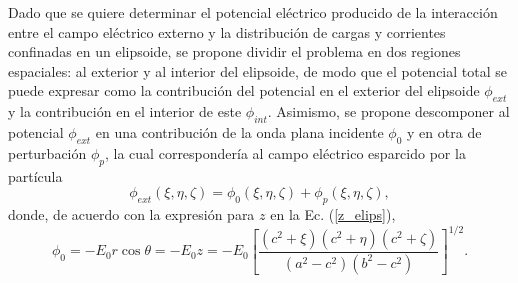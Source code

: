 Dado que se quiere determinar el potencial eléctrico producido de la interacción entre el campo eléctrico externo y la distribución de cargas y corrientes confinadas en un elipsoide, se propone dividir el problema en dos regiones espaciales: al exterior y al interior del elipsoide, de modo que el potencial total se puede expresar como la contribución del potencial en el exterior del elipsoide $\phi_{ext}$  y la contribución en el interior de este $\phi_{int}$. Asimismo, se propone descomponer al potencial $\phi_{ext}$ en una contribución de la onda plana incidente $\phi_0$ y en otra de perturbación $\phi_p$, la cual correspondería al campo eléctrico esparcido por la partícula
\begin{equation}
	\phi_{ext}(\xi,\eta,\zeta)=\phi_0(\xi,\eta,\zeta)+\phi_p(\xi,\eta,\zeta),    
\end{equation}
donde, de acuerdo con la expresión para $z$ en la Ec. (\ref{z_elips}),
\begin{equation}
	\phi_0=-E_0 r\cos\theta=-E_0 z=-E_0\left[\frac{(c^2+\xi)(c^2+\eta)(c^2+\zeta)}{(a^2-c^2)(b^2-c^2)}\right]^{1/2}.
	\label{pot_0}
\end{equation}

